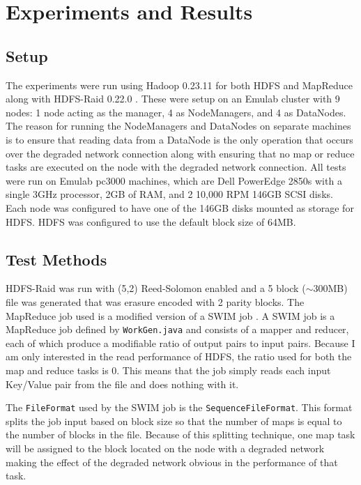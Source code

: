 \documentclass{ucetd}
\newcommand{\code}[1]{\texttt{#1}}
\begin{document}
\chapter{Experiments and Results}

\section{Setup}

The experiments were run using Hadoop 0.23.11 \cite{Hadoop:0.23.11} for both HDFS and MapReduce along
with HDFS-Raid 0.22.0 \cite{HDFS-Raid}. These were setup on an Emulab \cite{Emulab} cluster with
9 nodes: 1 node acting as the manager, 4 as NodeManagers, and 4 as DataNodes.
The reason for running the NodeManagers and DataNodes on separate machines is to
ensure that reading data from a DataNode is the only operation that occurs over
the degraded network connection along with ensuring that no map or reduce tasks
are executed on the node with the degraded network connection. All tests were
run on Emulab pc3000 machines, which are Dell PowerEdge 2850s with a single 3GHz
processor, 2GB of RAM, and 2 10,000 RPM 146GB SCSI disks. Each node was
configured to have one of the 146GB disks mounted as storage for HDFS. HDFS was
configured to use the default block size of 64MB.

\section{Test Methods}

HDFS-Raid was run with (5,2) Reed-Solomon enabled and a 5 block ($\sim$300MB)
file was generated that was erasure encoded with 2 parity blocks. The MapReduce
job used is a modified version of a SWIM job \cite{SWIM}. A SWIM job is a
MapReduce job defined by \code{WorkGen.java} and consists of a mapper and
reducer, each of which produce a modifiable ratio of output pairs to input
pairs. Because I am only interested in the read performance of HDFS, the ratio
used for both the map and reduce tasks is 0. This means that the job simply
reads each input Key/Value pair from the file and does nothing with it.

The \code{FileFormat} used by the SWIM job is the \code{SequenceFileFormat}.
This format splits the job input based on block size so that the number of maps
is equal to the number of blocks in the file. Because of this splitting
technique, one map task will be assigned to the block located on the node with a
degraded network making the effect of the degraded network obvious in the
performance of that task.
\end{document}
